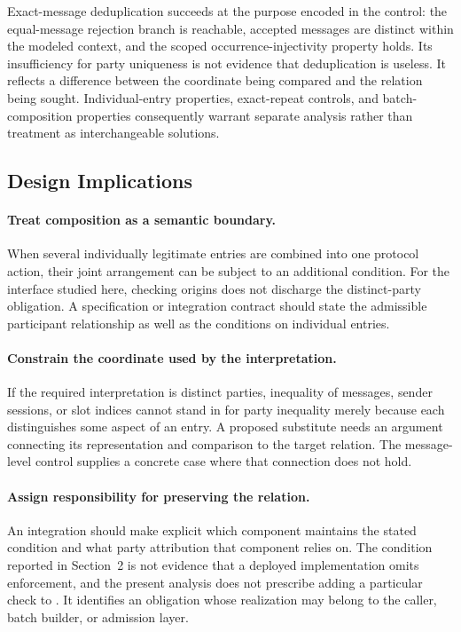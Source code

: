 Exact-message deduplication succeeds at the purpose encoded in the control:
the equal-message rejection branch is reachable, accepted messages are
distinct within the modeled context, and the scoped occurrence-injectivity
property holds. Its insufficiency for party uniqueness is not evidence that
deduplication is useless. It reflects a difference between the coordinate
being compared and the relation being sought. Individual-entry properties,
exact-repeat controls, and batch-composition properties consequently warrant
separate analysis rather than treatment as interchangeable solutions.

\subsection{Design Implications}

\paragraph{Treat composition as a semantic boundary.}
When several individually legitimate entries are combined into one protocol
action, their joint arrangement can be subject to an additional condition.
For the interface studied here, checking origins does not discharge the
distinct-party obligation. A specification or integration contract should
state the admissible participant relationship as well as the conditions on
individual entries.

\paragraph{Constrain the coordinate used by the interpretation.}
If the required interpretation is distinct parties, inequality of messages,
sender sessions, or slot indices cannot stand in for party inequality merely
because each distinguishes some aspect of an entry. A proposed substitute
needs an argument connecting its representation and comparison to the target
relation. The message-level control supplies a concrete case where that
connection does not hold.

\paragraph{Assign responsibility for preserving the relation.}
An integration should make explicit which component maintains the stated
condition and what party attribution that component relies on. The condition
reported in Section~2 is not evidence that a deployed implementation omits
enforcement, and the present analysis does not prescribe adding a particular
check to \kwaay. It identifies an obligation whose realization may belong to
the caller, batch builder, or admission layer.

